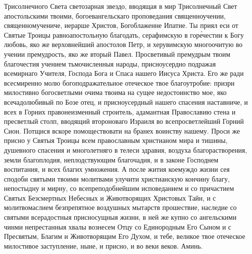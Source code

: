 \begin{mymulticols}
Трисолнечного Света светозарная звездо, вводящая в мир Трисолнечный Свет апостольскими твоими, богоевангельскаго проповедания священноучении, священномучениче, иерарше Христов, Богоблаженне Ипатие. Ты приял еси от Святые Троицы равноапостольную благодать, серафимскую в гор\'{е}честии к Богу любовь, яко же верховнейший апостолов Петр, и херувимскую многоочитую во учении премудрость, яко же вторый Павел. Просветивый премудрым твоим благочестия учением тьмочисленныя народы, присноусердно подражая всемирнаго Учителя, Господа Бога и Спаса нашего Иисуса Христа. Его же ради всесмиренно молю богоподражательное отеческое твое благоутробие: призри милостивно богосветлыми очима твоима на сущее недостоинство мое, яко всечадолюбивый по Бозе отец, и присноусердный нашего спасения наставниче, и всех в Горних правонеизменный строитель, адамантная Православию стена и пресветлый столп, вводящий второноваго Израиля во всепросветлейший Горний Сион. Потщися вскоре помоществовати на бранех воинству нашему. Проси же присно у Святыя Троицы всем православным христианом мира и тишины, душевного спасения и многолетняго в телеси здравия, воздуха благорастворения, земли благоплодия, неплодствующим благочадия, и в законе Господнем воспитания, и всех благих умножения. А после жития коемуждо жизни сея сподоби святыми твоими молитвами улучити христианскую кончину благу, непостыдну и мирну, со всепреподобнейшим исповеданием и со причастием Святых Безсмертных Небесных и Животворящих Христовых Тайн, и с молитвомаслием безпрепятное воздушных мытарств прошествие, наследие со святыми всерадостныя присносущныя жизни, в ней же купно со ангельскими чинми непрестанныя хвалы вознесем Отцу со Единородным Его Сыном и с Пресвятым, Благим и Животворящим Его Духом, и тебе, великое твое отеческое милостивое заступление, ныне, и присно, и во веки веков. Аминь.

\end{mymulticols}

\mychapterending


